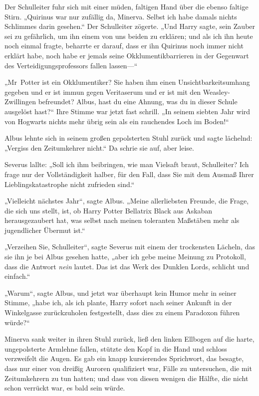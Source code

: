 {Der Schulleiter fuhr sich mit einer müden, faltigen Hand über die ebenso faltige Stirn. „Quirinus war nur zufällig da, Minerva. Selbst ich habe damals nichts Schlimmes darin gesehen.“ Der Schulleiter zögerte. „Und Harry sagte, sein Zauber sei zu gefährlich, um ihn einem von uns beiden zu erklären; und als ich ihn heute noch einmal fragte, beharrte er darauf, dass er ihn Quirinus noch immer nicht erklärt habe, noch habe er jemals seine Okklumentikbarrieren in der Gegenwart des Verteidigungsprofessors fallen lassen—“

„Mr~Potter ist ein Okklumentiker? Sie haben ihm einen Unsichtbarkeitsumhang gegeben und er ist immun gegen Veritaserum und er ist mit den Weasley-Zwillingen befreundet? Albus, hast du eine Ahnung, was du in dieser Schule ausgelöst hast?“ Ihre Stimme war jetzt fast schrill. „In seinem siebten Jahr wird von Hogwarts nichts mehr übrig sein als ein rauchendes Loch im Boden!“

Albus lehnte sich in seinem großen gepolsterten Stuhl zurück und sagte lächelnd: „Vergiss den Zeitumkehrer nicht.“ Da schrie sie auf, aber leise.

Severus lallte: „Soll ich ihm beibringen, wie man Vielsaft braut, Schulleiter? Ich frage nur der Vollständigkeit halber, für den Fall, dass Sie mit dem Ausmaß Ihrer Lieblingskatastrophe nicht zufrieden sind.“

„Vielleicht nächstes Jahr“, sagte Albus. „Meine allerliebsten Freunde, die Frage, die sich uns stellt, ist, ob Harry Potter Bellatrix Black aus Askaban herausgezaubert hat, was selbst nach meinen toleranten Maßstäben mehr als jugendlicher Übermut ist.“

„Verzeihen Sie, Schulleiter“, sagte Severus mit einem der trockensten Lächeln, das sie ihn je bei Albus gesehen hatte, „aber ich gebe meine Meinung zu Protokoll, dass die Antwort \emph{nein} lautet. Das ist das Werk des Dunklen Lords, schlicht und einfach.“

„Warum“, sagte Albus, und jetzt war überhaupt kein Humor mehr in seiner Stimme, „habe ich, als ich plante, Harry sofort nach seiner Ankunft in der Winkelgasse zurückzuholen festgestellt, dass dies zu einem Paradoxon führen würde?“

Minerva sank weiter in ihren Stuhl zurück, ließ den linken Ellbogen auf die harte, ungepolsterte Armlehne fallen, stützte den Kopf in die Hand und schloss verzweifelt die Augen. Es gab ein knapp kursierendes Sprichwort, das besagte, dass nur einer von dreißig Auroren qualifiziert war, Fälle zu untersuchen, die mit Zeitumkehrern zu tun hatten; und dass von diesen wenigen die Hälfte, die nicht schon verrückt war, es bald sein würde.

}
